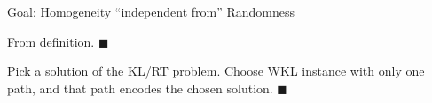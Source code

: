 \begin{frame}{Goal: Homogeneity ``independent from'' Randomness}
  \begin{observe*}
    From definition. $\blacksquare$
  \end{observe*}

  \begin{observe*}
    Pick a solution of the KL/RT problem. Choose WKL instance with only
    one path, and that path encodes the chosen solution. $\blacksquare$
  \end{observe*}

  \begin{center}
  \end{center}
\end{frame}
